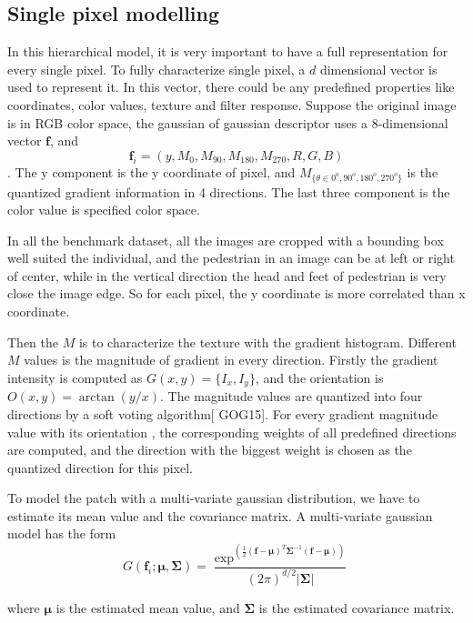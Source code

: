 \documentclass[conference,compsoc]{IEEEtran}
\begin{document}
\subsection{Single pixel modelling}

In this hierarchical model, it is very important to have a full representation for every single pixel. To fully characterize single pixel, a $d$ dimensional vector is used to represent it. In this vector, there could be any predefined properties like coordinates, color values, texture and filter response. Suppose the original image is in RGB color space, the gaussian of gaussian descriptor uses a 8-dimensional vector $\textbf{f}$, and 
$$\bm{f}_i = (y,M_0,M_{90},M_{180},M_{270},R,G,B)$$.
The y component is the y coordinate of pixel, and $M_{\{{\theta}\in{0^o,90^o,180^o,270^o}\}}$ is the quantized gradient information in 4 directions. The last three component is the color value is specified color space.

In all the benchmark dataset, all the images are cropped with a bounding box well suited the individual, and the pedestrian in an image can be at left or right of center, while in the vertical direction the head and feet of pedestrian is very close the image edge. So for each pixel, the y coordinate is more correlated than x coordinate. 

Then the $M$ is to characterize the texture with the gradient histogram. Different $M$ values is the magnitude of gradient in every direction. Firstly the gradient intensity is computed as $G(x,y) = \{I_x,I_y\}$, and the orientation is $O(x, y) = \arctan(y/x)$. The magnitude values are quantized into four directions by a soft voting algorithm[ GOG15]. For every gradient magnitude value with its orientation , the corresponding weights of all predefined directions are computed, and the direction with the biggest weight is chosen as the quantized direction for this pixel.

To model the patch with a multi-variate gaussian distribution, we have to estimate its mean value and the covariance matrix. A multi-variate gaussian model has the form
\begin{equation}
G(\bm{f}_i;\bm{\mu},\bm{\Sigma}) = \frac{\exp^{(\frac{1}{2}(\bm{f}-\bm{\mu})^T\bm{\Sigma}^{-1}(\bm{f}-\bm{\mu}))}}{(2\pi)^{d/2}|{\bm{\Sigma|}}} 
\end{equation}

where $\bm {\mu}$ is the estimated mean value, and $\bm {\Sigma} $ is the estimated covariance matrix. 
\end{document}
